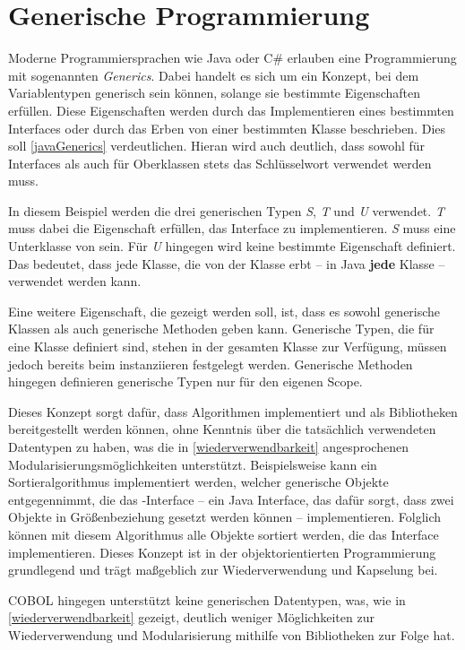 \section{Generische Programmierung}\label{generics}
Moderne Programmiersprachen wie Java oder C\# erlauben eine Programmierung mit sogenannten \textit{Generics}. Dabei handelt es sich um ein Konzept, bei dem Variablentypen generisch sein können, solange sie bestimmte Eigenschaften erfüllen. Diese Eigenschaften werden durch das Implementieren eines bestimmten Interfaces oder durch das Erben von einer bestimmten Klasse beschrieben. Dies soll \autoref{javaGenerics} verdeutlichen. Hieran wird auch deutlich, dass sowohl für Interfaces als auch für Oberklassen stets das Schlüsselwort  verwendet werden muss.

In diesem Beispiel werden die drei generischen Typen \textit{S}, \textit{T} und \textit{U} verwendet. \textit{T} muss dabei die Eigenschaft erfüllen, das  Interface zu implementieren. \textit{S} muss eine Unterklasse von  sein. Für \textit{U} hingegen wird keine bestimmte Eigenschaft definiert. Das bedeutet, dass jede Klasse, die von der Klasse  erbt -- in Java \textbf{jede} Klasse -- verwendet werden kann. 

Eine weitere Eigenschaft, die gezeigt werden soll, ist, dass es sowohl generische Klassen als auch generische Methoden geben kann. Generische Typen, die für eine Klasse definiert sind, stehen in der gesamten Klasse zur Verfügung, müssen jedoch bereits beim instanziieren festgelegt werden. Generische Methoden hingegen definieren generische Typen nur für den eigenen Scope.


Dieses Konzept sorgt dafür, dass Algorithmen implementiert und als Bibliotheken bereitgestellt werden können, ohne Kenntnis über die tatsächlich verwendeten Datentypen zu haben, was die in \autoref{wiederverwendbarkeit} angesprochenen Modularisierungsmöglichkeiten unterstützt. Beispielsweise kann ein Sortieralgorithmus implementiert werden, welcher generische Objekte entgegennimmt, die das -Interface -- ein Java Interface, das dafür sorgt, dass zwei Objekte in Größenbeziehung gesetzt werden können -- implementieren. Folglich können mit diesem Algorithmus alle Objekte sortiert werden, die das Interface implementieren. Dieses Konzept ist in der objektorientierten Programmierung grundlegend und trägt maßgeblich zur Wiederverwendung und Kapselung bei.

COBOL hingegen unterstützt keine generischen Datentypen, was, wie in \autoref{wiederverwendbarkeit} gezeigt, deutlich weniger Möglichkeiten zur Wiederverwendung und Modularisierung mithilfe von Bibliotheken zur Folge hat.